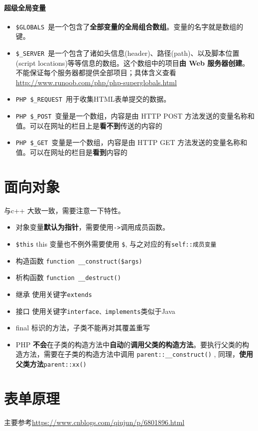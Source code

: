 \documentclass[UTF8,a4paper,12pt]{ctexbook}
\begin{document}
		\paragraph{超级全局变量}
			\begin{itemize}
				\item \verb|$GLOBALS |是一个包含了\textbf{全部变量的全局组合数组}。变量的名字就是数组的键。
				\item \verb|$_SERVER |是一个包含了诸如头信息(header)、路径(path)、以及脚本位置(script locations)等等信息的数组。这个数组中的项目\textbf{由 Web 服务器创建}。不能保证每个服务器都提供全部项目；具体含义查看\url{http://www.runoob.com/php/php-superglobals.html}
				\item \verb|PHP $_REQUEST |用于收集HTML表单提交的数据。
				\item \verb|PHP $_POST |变量是一个数组，内容是由 HTTP POST 方法发送的变量名称和值。可以在网址的栏目上是\textbf{看不到}传送的内容的
				\item \verb|PHP $_GET |变量是一个数组，内容是由 HTTP GET 方法发送的变量名称和值。可以在网址的栏目是\textbf{看到}内容的
			\end{itemize}
			
	
	\section{面向对象}
		与c++  大致一致，需要注意一下特性。
		\begin{itemize}
			\item 对象变量\textbf{默认为指针}，需要使用\verb|->|调用成员函数。
			\item \verb|$this| this 变量也不例外需要使用 \verb|$|, 与之对应的有\verb|self::成员变量 |
			\item 构造函数 \verb|function __construct($args)|
			\item 析构函数 \verb|function __destruct()|
			\item 继承 使用关键字\verb|extends |
			\item 接口 使用关键字\verb|interface、implements|类似于Java
			\item final 标识的方法，子类不能再对其覆盖重写
			\item PHP \textbf{不会}在子类的构造方法中\textbf{自动}的\textbf{调用父类的构造方法}。要执行父类的构造方法，需要在子类的构造方法中调用 \verb|parent::__construct()| , 同理，\textbf{使用父类方法}\verb|parent::xx()|
		\end{itemize}
		
	
	
	\section{表单原理}
		主要参考\url{https://www.cnblogs.com/qiujun/p/6801896.html}
		
\end{document}
